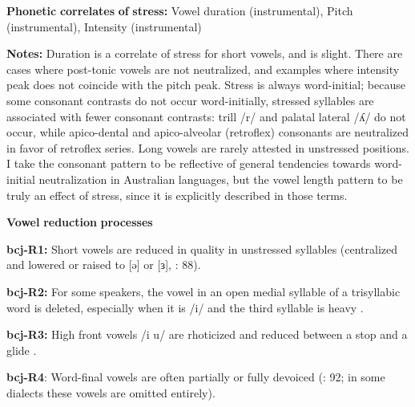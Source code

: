 \documentclass[output=paper]{langsci/langscibook}
\begin{document}
\begin{styleBody}
\textbf{Phonetic} \textbf{correlates} \textbf{of} \textbf{stress:} Vowel duration (instrumental), Pitch (instrumental), Intensity (instrumental)
\end{styleBody}

\begin{styleBody}
\textbf{Notes:} Duration is a correlate of stress for short vowels, and is slight. There are cases where post-tonic vowels are not neutralized, and examples where intensity peak does not coincide with the pitch peak. Stress is always word-initial; because some consonant contrasts do not occur word-initially, stressed syllables are associated with fewer consonant contrasts: trill /r/ and palatal lateral /ʎ/ do not occur, while apico-dental and apico-alveolar (retroflex) consonants are neutralized in favor of retroflex series. Long vowels are rarely attested in unstressed positions. I take the consonant pattern to be reflective of general tendencies towards word-initial neutralization in Australian languages, but the vowel length pattern to be truly an effect of stress, since it is explicitly described in those terms.
\end{styleBody}

\begin{styleBody}
\textbf{Vowel} \textbf{reduction} \textbf{processes}
\end{styleBody}

\begin{styleBody}
\textbf{bcj-R1:} Short vowels are reduced in quality in unstressed syllables (centralized and lowered or raised to [ə] or [ɜ], \citealt{Bowern2012}: 88).
\end{styleBody}

\begin{styleBody}
\textbf{bcj-R2:} For some speakers, the vowel in an open medial syllable of a trisyllabic word is deleted, especially when it is /i/ and the third syllable is heavy \citep[91]{Bowern2012}.
\end{styleBody}

\begin{styleBody}
\textbf{bcj-R3:} High front vowels /i u/ are rhoticized and reduced between a stop and a glide \citep[91]{Bowern2012}.
\end{styleBody}

\begin{styleBody}
\textbf{bcj-R4}: Word-final vowels are often partially or fully devoiced (\citealt{Bowern2012}: 92; in some dialects these vowels are omitted entirely).
\end{styleBody}
\end{document}
